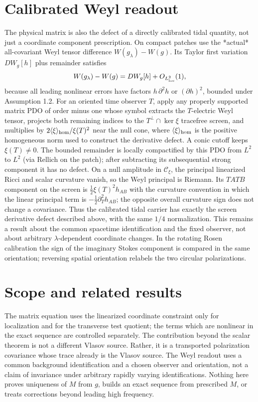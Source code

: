 \documentclass[11pt]{article}
\begin{document}
\section{Calibrated Weyl readout}
The physical matrix is also the defect of a directly calibrated tidal quantity, not just a coordinate component prescription. On compact patches use the *actual* all-covariant Weyl tensor difference \(W(g_\lambda)-W(g)\). Its Taylor first variation \(DW_g[h]\) plus remainder satisfies
\[
 W(g_\lambda)-W(g)=DW_g[h]+O_{L^2_{\rm loc}}(1),
\]
because all leading nonlinear errors have factors \(h\,\partial^2h\) or \((\partial h)^2\), bounded under Assumption 1.2. For an oriented time observer \(T\), apply any properly supported matrix PDO of order minus one whose symbol extracts the \(T\)-electric Weyl tensor, projects both remaining indices to the \(T^\perp\cap\ker\xi\) tracefree screen, and multiplies by \(2\langle\xi\rangle_{\rm hom}/\xi(T)^2\) near the null cone, where \(\langle\xi\rangle_{\rm hom}\) is the positive homogeneous norm used to construct the derivative defect. A conic cutoff keeps \(\xi(T)\ne0\). The bounded remainder is locally compactified by this PDO from \(L^2\) to \(L^2\) (via Rellich on the patch); after subtracting its subsequential strong component it has no defect. On a null amplitude in \(\mathcal C_\xi\), the principal linearized Ricci and scalar curvature vanish, so the Weyl principal is Riemann. Its \(TATB\) component on the screen is \(\frac12 \xi(T)^2h_{AB}\) with the curvature convention in which the linear principal term is \(-\frac12\partial_T^2 h_{AB}\); the opposite overall curvature sign does not change a covariance. Thus the calibrated tidal carrier has exactly the screen derivative defect described above, with the same \(1/4\) normalization. This remains a result about the common spacetime identification and the fixed observer, not about arbitrary \(\lambda\)-dependent coordinate changes. In the rotating Rosen calibration the sign of the imaginary Stokes component is compared in the same orientation; reversing spatial orientation relabels the two circular polarizations.


\section{Scope and related results}

The matrix equation uses the linearized coordinate constraint only for localization and for the transverse test quotient; the terms which are nonlinear in the exact sequence are controlled separately. The contribution beyond the scalar theorem is not a different Vlasov source. Rather, it is a transported polarization covariance whose trace already is the Vlasov source. The Weyl readout uses a common background identification and a chosen observer and orientation, not a claim of invariance under arbitrary rapidly varying identifications. Nothing here proves uniqueness of \(M\) from \(g\), builds an exact sequence from prescribed \(M\), or treats corrections beyond leading high frequency.
\end{document}
